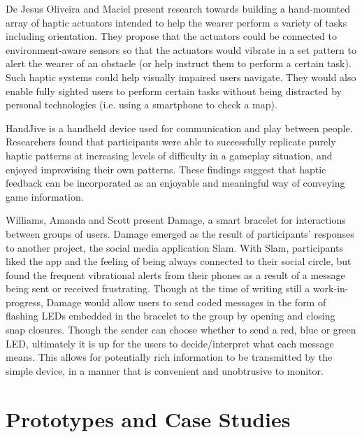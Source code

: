 \documentclass{chi-ext}
\begin{document}
De Jesus Oliveira and Maciel \cite{Jesus-Oliveira:2013aa} present research towards building a hand-mounted array of haptic actuators intended to help the wearer perform a variety of tasks including orientation. They propose that the actuators could be connected to environment-aware sensors so that the actuators would vibrate in a set pattern to alert the wearer of an obstacle (or help instruct them to perform a certain task). Such haptic systems could help visually impaired users navigate. They would also enable fully sighted users to perform certain tasks without being distracted by personal technologies (i.e. using a smartphone to check a map).

\cite{fogg1998handjive}HandJive is a handheld device used for communication and play between people. Researchers found that participants were able to successfully replicate purely haptic patterns at increasing levels of difficulty in a gameplay situation, and enjoyed improvising their own patterns. These findings suggest that haptic feedback can be incorporated as an enjoyable and meaningful way of conveying game information.

\cite{williams2006exploring}Williams, Amanda and Scott present Damage, a smart bracelet for interactions between groups of users. Damage emerged as the result of participants' responses to another project, the social media application Slam. With Slam, participants liked the app and the feeling of being always connected to their social circle, but found the frequent vibrational alerts from their phones as a result of a message being sent or received frustrating. Though at the time of writing still a work-in-progress, Damage would allow users to send coded messages in the form of flashing LEDs embedded in the bracelet to the group by opening and closing snap closures. Though the sender can choose whether to send a red, blue or green LED, ultimately it is up for the users to decide/interpret what each message means. This allows for potentially rich information to be transmitted by the simple device, in a manner that is convenient and unobtrusive to monitor.

\section{Prototypes and Case Studies}
\end{document}
